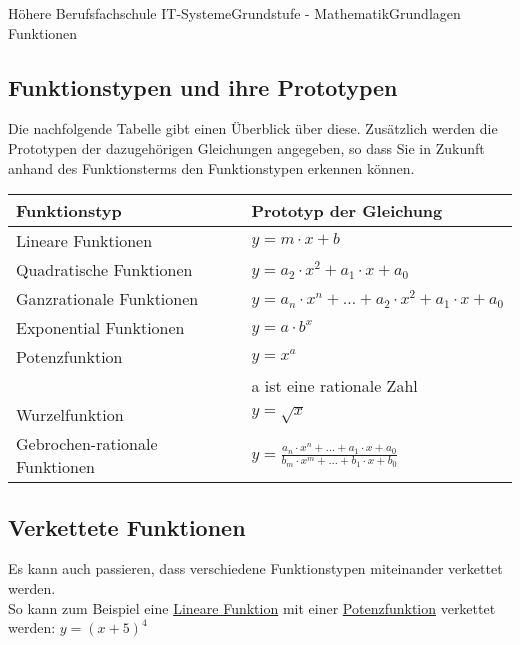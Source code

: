 \documentclass[11pt,twocolumn,oneside,openany,headings=optiontotoc,11pt,numbers=noenddot]{article}
\begin{document}
\begin{worksheet}{Höhere Berufsfachschule IT-Systeme}{Grundstufe - Mathematik}{Grundlagen Funktionen}
		\subsection{Funktionstypen und ihre Prototypen}
		Die nachfolgende Tabelle gibt einen Überblick über diese. Zusätzlich werden die Prototypen der dazugehörigen Gleichungen angegeben, so dass Sie in Zukunft anhand des Funktionsterms den Funktionstypen erkennen können.\\
		\par\bigskip\noindent
		\begin{tabularx}{0.5\textwidth}{|X|X|}
			\hline
			\textbf{Funktionstyp} & \textbf{Prototyp der Gleichung}\\
			\hline
			Lineare Funktionen & \(y = m\cdot{}x + b\)\\
			\hline
			Quadratische Funktionen & \(y = a_2\cdot{}x^2 + a_1\cdot{}x + a_0\)\\
			\hline
			Ganzrationale Funktionen & \(y = a_n\cdot{}x^n + \ldots{} + a_2\cdot{}x^2 + a_1\cdot{}x + a_0\)\\
			\hline
			Exponential Funktionen & \(y = a\cdot{} b^x\)\\
			\hline
			Potenzfunktion & \(y = x^a\)\\
			& a ist eine rationale Zahl\\
			\hline
			Wurzelfunktion & \(y = \sqrt{x}\)\\
			\hline
			Gebrochen-rationale Funktionen & \(y = \frac{a_n\cdot{}x^n + \ldots{} + a_1\cdot{}x + a_0}{b_m\cdot{}x^m + \ldots{} + b_1\cdot{}x + b_0}\)\\
			\hline
		\end{tabularx}
		\subsection{Verkettete Funktionen}
		Es kann auch passieren, dass verschiedene Funktionstypen miteinander verkettet werden.\\
		So kann zum Beispiel eine \underline{Lineare Funktion} mit einer \underline{Potenzfunktion} verkettet werden: \(y = (x +5)^4\)
	\end{worksheet}
\end{document}
